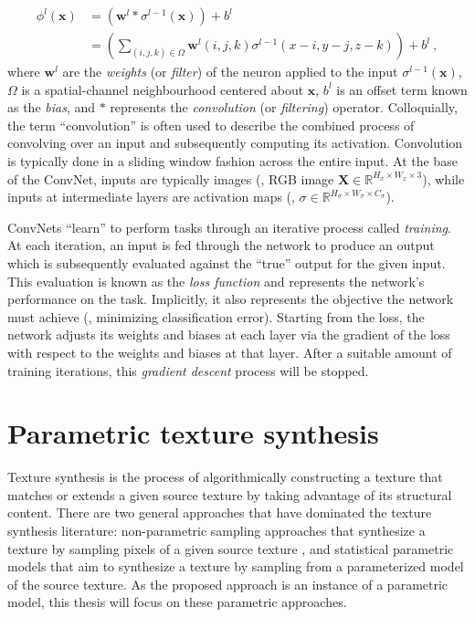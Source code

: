 \begin{equation}
	\begin{aligned}
		\phi^l(\mathbf{x}) &= \left(\mathbf{w}^l * \sigma^{l-1}(\mathbf{x})\right) + b^l\\
		&= \left(\sum_{(i, j, k) \in \Omega} \mathbf{w}^l(i, j, k) \sigma^{l-1}(x - i, y - j, z - k)\right) + b^l\ ,
	\end{aligned}
\end{equation}
where $\mathbf{w}^l$ are the \emph{weights} (or \emph{filter}) of the neuron applied to the input $\sigma^{l-1}(\mathbf{x})$, $\Omega$ is a spatial-channel neighbourhood centered about $\mathbf{x}$, $b^l$ is an offset term known as the \emph{bias}, and $\ast$ represents the \emph{convolution} (or \emph{filtering}) operator. Colloquially, the term ``convolution'' is often used to describe the combined process of convolving over an input and subsequently computing its activation. Convolution is typically done in a sliding window fashion across the entire input. At the base of the ConvNet, inputs are typically images (\eg, RGB image $\mathbf{X} \in \mathbb{R}^{H_x \times W_x \times 3}$), while inputs at intermediate layers are activation maps (\eg, $\sigma \in \mathbb{R}^{H_\sigma \times W_\sigma \times C_\sigma}$). 

ConvNets ``learn'' to perform tasks through an iterative process called \emph{training}. At each iteration, an input is fed through the network to produce an output which is subsequently evaluated against the ``true'' output for the given input. This evaluation is known as the \emph{loss function} and represents the network's performance on the task. Implicitly, it also represents the objective the network must achieve (\eg, minimizing classification error). Starting from the loss, the network adjusts its weights and biases at each layer via the gradient of the loss with respect to the weights and biases at that layer. After a suitable amount of training iterations, this \emph{gradient descent} process will be stopped.

\section{Parametric texture synthesis}

Texture synthesis is the process of algorithmically constructing a texture that
matches or extends a given source texture by taking advantage of its structural 
content. There are two general approaches that have dominated the texture
synthesis literature: non-parametric sampling approaches that
synthesize a texture by sampling pixels of a given source texture
\cite{efros1999,kwatra2003graphcut,schodl2000,wei2000}, and 
statistical parametric models that aim to synthesize a texture by sampling
from a parameterized model of the source texture.
As the proposed approach is an instance of a parametric model, this thesis 
will focus on these parametric approaches.

